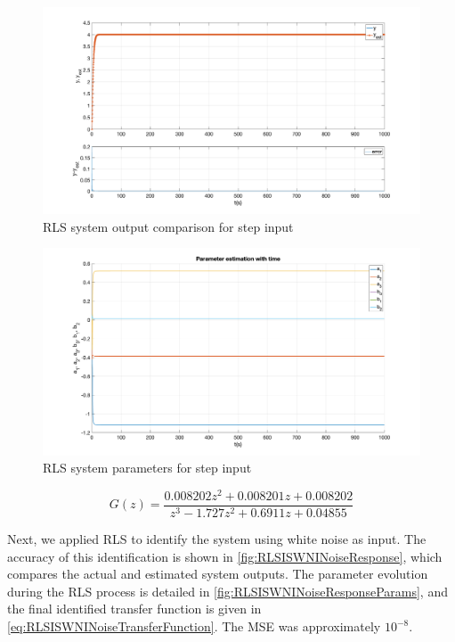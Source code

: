 \begin{figure}
	\centering
	\includegraphics[totalheight=8cm]{images/RLSISWNIStepResponse.png}
	\caption{RLS system output comparison for step input}
	\label{fig:RLSISWNIStepResponse}
\end{figure}
\begin{figure}
	\centering
	\includegraphics[totalheight=8cm]{images/RLSISWNIStepResponseParams.png}
	\caption{RLS system parameters for step input}
	\label{fig:RLSISWNIStepResponseParams}
\end{figure}
\begin{equation}
	G(z) =	\frac{0.008202 z^2 + 0.008201 z + 0.008202}{z^3 - 1.727 z^2 + 0.6911 z + 0.04855}
	\label{eq:RLSISWNIStepTransferFunction}
\end{equation}

Next, we applied RLS to identify the system using white noise as input. The accuracy of this identification is shown in \autoref{fig:RLSISWNINoiseResponse}, which compares the actual and estimated system outputs. The parameter evolution during the RLS process is detailed in \autoref{fig:RLSISWNINoiseResponseParams}, and the final identified transfer function is given in \autoref{eq:RLSISWNINoiseTransferFunction}. The MSE was approximately $10^{-8}$.

